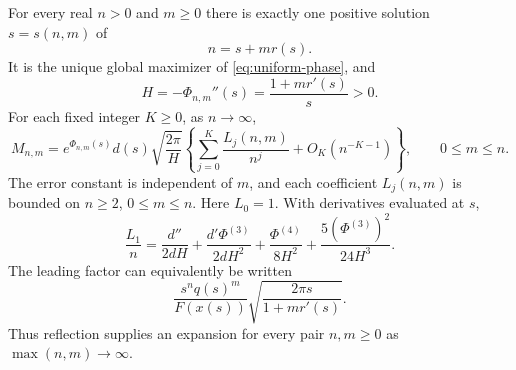 \begin{theorem}
\label{thm:all-ratio}
For every real $n>0$ and $m\ge0$ there is exactly one positive solution
$s=s(n,m)$ of
\begin{equation}\label{eq:uniform-saddle}
 n=s+m r(s).
\end{equation}
It is the unique global maximizer of \eqref{eq:uniform-phase}, and
\[
 H=-\Phi_{n,m}''(s)=\frac{1+m r'(s)}{s}>0.
\]
For each fixed integer $K\ge0$, as $n\to\infty$,
\begin{equation}\label{eq:uniform-moment-expansion}
 M_{n,m}=e^{\Phi_{n,m}(s)}d(s)\sqrt{\frac{2\pi}{H}}
 \left\{\sum_{j=0}^{K}\frac{L_j(n,m)}{n^j}
                  +O_K(n^{-K-1})\right\},
 \qquad 0\le m\le n.
\end{equation}
The error constant is independent of $m$, and each coefficient
$L_j(n,m)$ is bounded on $n\ge2$, $0\le m\le n$.
Here $L_0=1$. With derivatives evaluated at $s$,
\begin{equation}\label{eq:uniform-first}
 \frac{L_1}{n}=
 \frac{d''}{2dH}
 +\frac{d'\Phi^{(3)}}{2dH^2}
 +\frac{\Phi^{(4)}}{8H^2}
 +\frac{5(\Phi^{(3)})^2}{24H^3}.
\end{equation}
The leading factor can equivalently be written
\begin{equation}\label{eq:uniform-leading-x}
 \frac{s^n q(s)^m}{F(x(s))}
       \sqrt{\frac{2\pi s}{1+m r'(s)}}.
\end{equation}
Thus reflection supplies an expansion for every pair $n,m\ge0$ as
$\max(n,m)\to\infty$.
\end{theorem}

